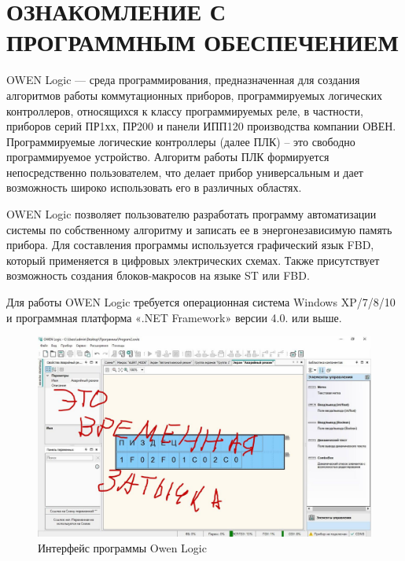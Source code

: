 \chapter{ОЗНАКОМЛЕНИЕ С ПРОГРАММНЫМ ОБЕСПЕЧЕНИЕМ}
OWEN Logic --- среда программирования, предназначенная для создания алгоритмов работы коммутационных приборов, программируемых логических контроллеров, относящихся к классу программируемых реле, в частности, приборов серий ПР1хх, ПР200 и панели ИПП120 производства компании ОВЕН. Программируемые логические контроллеры (далее ПЛК) -- это свободно программируемое устройство. Алгоритм работы ПЛК формируется непосредственно пользователем, что делает прибор универсальным и дает возможность широко использовать его в различных областях.

OWEN Logic позволяет пользователю разработать программу автоматизации системы по собственному алгоритму и записать ее в энергонезависимую память прибора. Для составления программы используется графический язык FBD, который применяется в цифровых электрических схемах. Также присутствует возможность создания блоков-макросов на языке ST или FBD.

Для работы OWEN Logic требуется операционная система Windows XP/7/8/10 и программная платформа «.NET Framework» версии 4.0. или выше.

\begin{figure}[hb]
    \centering
    \includegraphics[scale=0.30]{fig/4.1.jpg}
    \caption{Интерфейс программы Owen Logic}
    \label{fig:owenlogic}
\end{figure}

\newpage

